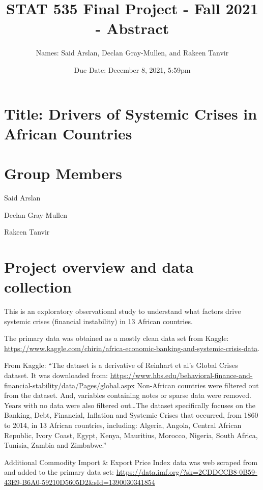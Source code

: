 \documentclass[
]{article}
\title{STAT 535 Final Project - Fall 2021 - Abstract}
\author{Names: Said Arslan, Declan Gray-Mullen, and Rakeen Tanvir}
\date{Due Date: December 8, 2021, 5:59pm}
\begin{document}
\maketitle

{
\setcounter{tocdepth}{2}
\tableofcontents
}
\hypertarget{title-drivers-of-systemic-crises-in-african-countries}{%
\section{Title: Drivers of Systemic Crises in African
Countries}\label{title-drivers-of-systemic-crises-in-african-countries}}

\hypertarget{group-members}{%
\section{Group Members}\label{group-members}}

Said Arslan

Declan Gray-Mullen

Rakeen Tanvir

\hypertarget{project-overview-and-data-collection}{%
\section{Project overview and data
collection}\label{project-overview-and-data-collection}}

This is an exploratory observational study to understand what factors
drive systemic crises (financial instability) in 13 African countries.

The primary data was obtained as a mostly clean data set from Kaggle:
\url{https://www.kaggle.com/chirin/africa-economic-banking-and-systemic-crisis-data}.

From Kaggle: ``The dataset is a derivative of Reinhart et al's Global
Crises dataset. It was downloaded from:
\url{https://www.hbs.edu/behavioral-finance-and-financial-stability/data/Pages/global.aspx}
Non-African countries were filtered out from the dataset. And, variables
containing notes or sparse data were removed. Years with no data were
also filtered out\ldots The dataset specifically focuses on the Banking,
Debt, Financial, Inflation and Systemic Crises that occurred, from 1860
to 2014, in 13 African countries, including: Algeria, Angola, Central
African Republic, Ivory Coast, Egypt, Kenya, Mauritius, Morocco,
Nigeria, South Africa, Tunisia, Zambia and Zimbabwe.''

Additional Commodity Import \& Export Price Index data was web scraped
from and added to the primary data set:
\url{https://data.imf.org/?sk=2CDDCCB8-0B59-43E9-B6A0-59210D5605D2\&sId=1390030341854}
\end{document}
